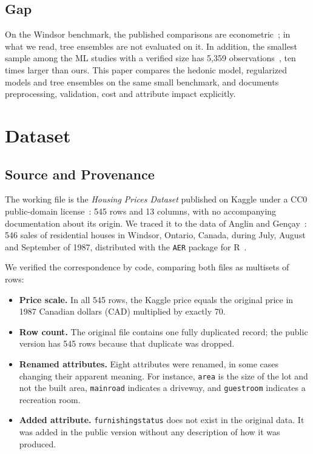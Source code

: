 \documentclass[conference]{IEEEtran}
\begin{document}
\subsection{Gap}

On the Windsor benchmark, the published comparisons are econometric~\cite{anglin1996,parmeter2007,haupt2010}; in what we read, tree ensembles are not evaluated on it. In addition, the smallest sample among the ML studies with a verified size has 5,359 observations~\cite{park2015}, ten times larger than ours. This paper compares the hedonic model, regularized models and tree ensembles on the same small benchmark, and documents preprocessing, validation, cost and attribute impact explicitly.

\section{Dataset}
\label{sec:data}

\subsection{Source and Provenance}

The working file is the \emph{Housing Prices Dataset} published on Kaggle under a CC0 public-domain license~\cite{kaggle_housing}: 545 rows and 13 columns, with no accompanying documentation about its origin. We traced it to the data of Anglin and Gen\c{c}ay~\cite{anglin1996}: 546 sales of residential houses in Windsor, Ontario, Canada, during July, August and September of 1987, distributed with the \texttt{AER} package for R~\cite{kleiber2008}.

We verified the correspondence by code, comparing both files as multisets of rows:
\begin{itemize}
  \item \textbf{Price scale.} In all 545 rows, the Kaggle price equals the original price in 1987 Canadian dollars (CAD) multiplied by exactly 70.
  \item \textbf{Row count.} The original file contains one fully duplicated record; the public version has 545 rows because that duplicate was dropped.
  \item \textbf{Renamed attributes.} Eight attributes were renamed, in some cases changing their apparent meaning. For instance, \texttt{area} is the size of the lot and not the built area, \texttt{mainroad} indicates a driveway, and \texttt{guestroom} indicates a recreation room.
  \item \textbf{Added attribute.} \texttt{furnishingstatus} does not exist in the original data. It was added in the public version without any description of how it was produced.
\end{itemize}
\end{document}

